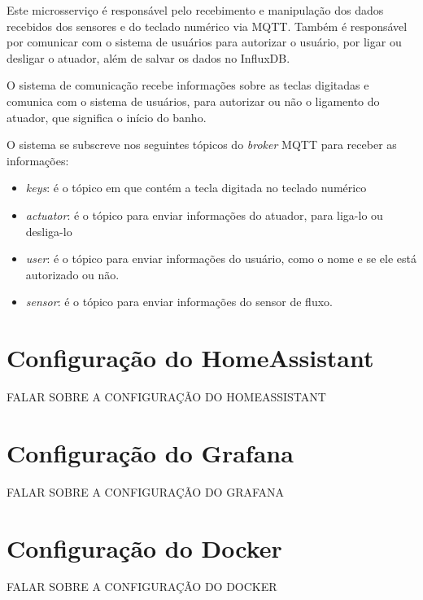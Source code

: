 Este microsserviço é responsável pelo recebimento e manipulação dos dados recebidos dos sensores e do teclado numérico via MQTT. Também é responsável por comunicar com o sistema de usuários para autorizar o usuário, por ligar ou desligar o atuador, além de salvar os dados no InfluxDB.

O sistema de comunicação recebe informações sobre as teclas digitadas e comunica com o sistema de usuários, para autorizar ou não o ligamento do atuador, que significa o início do banho.

O sistema se subscreve nos seguintes tópicos do \textit{broker} MQTT para receber as informações:

\begin{itemize}
	\item \textit{keys}: é o tópico em que contém a tecla digitada no teclado numérico
	\item \textit{actuator}: é o tópico para enviar informações do atuador, para liga-lo ou desliga-lo
	\item \textit{user}: é o tópico para enviar informações do usuário, como o nome e se ele está autorizado ou não.
	\item \textit{sensor}: é o tópico para enviar informações do sensor de fluxo.
\end{itemize}

\section{Configuração do HomeAssistant}

FALAR SOBRE A CONFIGURAÇÃO DO HOMEASSISTANT

\section{Configuração do Grafana}

FALAR SOBRE A CONFIGURAÇÃO DO GRAFANA

\section{Configuração do Docker}

FALAR SOBRE A CONFIGURAÇÃO DO DOCKER


